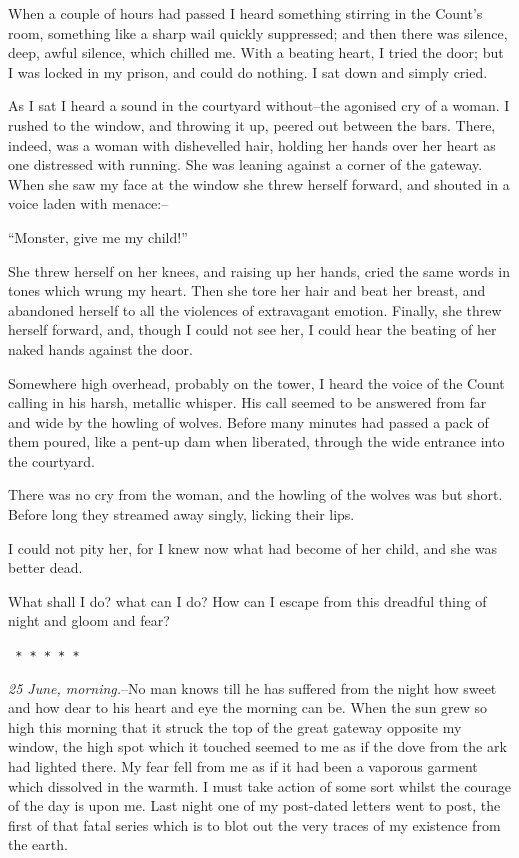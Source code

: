 \documentclass[12pt,openright]{book}
\begin{document}
When a couple of hours had passed I heard something stirring in the Count’s room, something like a sharp wail quickly suppressed; and then there was silence, deep, awful silence, which chilled me. With a beating heart, I tried the door; but I was locked in my prison, and could do nothing. I sat down and simply cried.

As I sat I heard a sound in the courtyard without–the agonised cry of a woman. I rushed to the window, and throwing it up, peered out between the bars. There, indeed, was a woman with dishevelled hair, holding her hands over her heart as one distressed with running. She was leaning against a corner of the gateway. When she saw my face at the window she threw herself forward, and shouted in a voice laden with menace:–

“Monster, give me my child!”

She threw herself on her knees, and raising up her hands, cried the same words in tones which wrung my heart. Then she tore her hair and beat her breast, and abandoned herself to all the violences of extravagant emotion. Finally, she threw herself forward, and, though I could not see her, I could hear the beating of her naked hands against the door.

Somewhere high overhead, probably on the tower, I heard the voice of the Count calling in his harsh, metallic whisper. His call seemed to be answered from far and wide by the howling of wolves. Before many minutes had passed a pack of them poured, like a pent-up dam when liberated, through the wide entrance into the courtyard.

There was no cry from the woman, and the howling of the wolves was but short. Before long they streamed away singly, licking their lips.

I could not pity her, for I knew now what had become of her child, and she was better dead.

What shall I do? what can I do? How can I escape from this dreadful thing of night and gloom and fear?

\texttt{   *       *       *       *       *}

\textit{25 June, morning.}–No man knows till he has suffered from the night how sweet and how dear to his heart and eye the morning can be. When the sun grew so high this morning that it struck the top of the great gateway opposite my window, the high spot which it touched seemed to me as if the dove from the ark had lighted there. My fear fell from me as if it had been a vaporous garment which dissolved in the warmth. I must take action of some sort whilst the courage of the day is upon me. Last night one of my post-dated letters went to post, the first of that fatal series which is to blot out the very traces of my existence from the earth.
\end{document}
